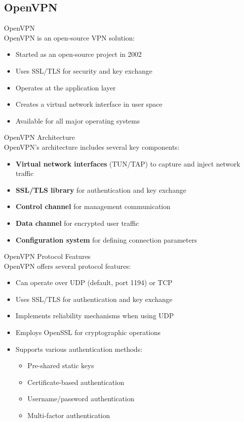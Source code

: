 \subsection{OpenVPN}

\begin{definition}{OpenVPN}\\
OpenVPN is an open-source VPN solution:
\begin{itemize}
    \item Started as an open-source project in 2002
    \item Uses SSL/TLS for security and key exchange
    \item Operates at the application layer
    \item Creates a virtual network interface in user space
    \item Available for all major operating systems
\end{itemize}
\end{definition}

\begin{concept}{OpenVPN Architecture}\\
OpenVPN's architecture includes several key components:
\begin{itemize}
    \item \textbf{Virtual network interfaces} (TUN/TAP) to capture and inject network traffic
    \item \textbf{SSL/TLS library} for authentication and key exchange
    \item \textbf{Control channel} for management communication
    \item \textbf{Data channel} for encrypted user traffic
    \item \textbf{Configuration system} for defining connection parameters
\end{itemize}
\end{concept}

\begin{theorem}{OpenVPN Protocol Features}\\
OpenVPN offers several protocol features:
\begin{itemize}
    \item Can operate over UDP (default, port 1194) or TCP
    \item Uses SSL/TLS for authentication and key exchange
    \item Implements reliability mechanisms when using UDP
    \item Employs OpenSSL for cryptographic operations
    \item Supports various authentication methods:
    \begin{itemize}
        \item Pre-shared static keys
        \item Certificate-based authentication
        \item Username/password authentication
        \item Multi-factor authentication
    \end{itemize}
\end{itemize}
\end{theorem}

